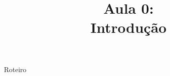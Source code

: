 


\title{Aula 0: \\ Introdução}





\begin{frame}

	\maketitle

\end{frame}


\begin{frame}{Roteiro}

	\tableofcontents

\end{frame}
















